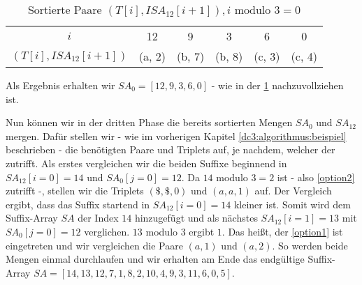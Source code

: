 \begin{table}[H]
	\centering
	\begin{tabular}{c| c c c c c}
		$i$ & 12 & 9 & 3 & 6 & 0 \\
		$(T[i], {ISA}_{12}[i+1])$  & (a, 2) & (b, 7) & (b, 8) & (c, 3) &  (c, 4)
	\end{tabular}
	\caption{Sortierte Paare $(T[i], {ISA}_{12}[i+1]), i \text{ modulo } 3 = 0$}
	\label{tab:SA01}
\end{table}

Als Ergebnis erhalten wir $SA_{0} = [12, 9, 3, 6, 0]$ - wie in der \cref{tab:SA01} nachzuvollziehen ist.

Nun können wir in der dritten Phase die bereits sortierten Mengen $SA_{0}$ und $SA_{12}$ mergen. Dafür stellen wir - wie im vorherigen Kapitel \ref{dc3:algorithmus:beispiel} beschrieben - die benötigten Paare und Triplets auf, je nachdem, welcher der  zutrifft. Als erstes vergleichen wir die beiden Suffixe beginnend in $SA_{12}[i = 0] = 14$ und $SA_{0}[j = 0] = 12$. Da $14$ modulo $3 = 2$ ist - also \cref{option2} zutrifft -, stellen wir die Triplets $(\$,\$,0)$ und $(a,a,1)$ auf. Der Vergleich ergibt, dass das Suffix startend in $SA_{12}[i = 0] = 14$ kleiner ist. Somit wird dem Suffix-Array $SA$ der Index $14$ hinzugefügt und als nächstes $SA_{12}[i = 1] = 13$ mit $SA_{0}[j = 0] = 12$ verglichen. $13$ modulo $3$ ergibt $1$. Das heißt, der \cref{option1} ist eingetreten und wir vergleichen die Paare $(a,1)$ und $(a, 2)$. So werden beide Mengen einmal durchlaufen und wir erhalten am Ende das endgültige Suffix-Array $SA = [14, 13, 12, 7, 1, 8, 2, 10, 4, 9, 3, 11, 6, 0, 5]$.